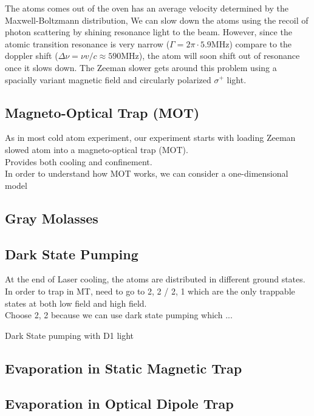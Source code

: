 The atoms comes out of the oven has an average velocity determined by the Maxwell-Boltzmann distribution,
We can slow down the atoms using the recoil of photon scattering by shining resonance light to the beam. However, since the atomic transition resonance is very narrow ($\Gamma=2\pi\cdot5.9\text{MHz}$) compare to the doppler shift ($\Delta\nu=\nu v/c\approx590\text{MHz}$), the atom will soon shift out of resonance once it slows down. The Zeeman slower gets around this problem using a spacially variant magnetic field and circularly polarized $\sigma^+$ light.


\subsection{Magneto-Optical Trap (MOT)}\label{theory:mot}

As in most cold atom experiment, our experiment starts with loading Zeeman slowed atom into a magneto-optical trap (MOT).\\
Provides both cooling and confinement.\\
In order to understand how MOT works, we can consider a one-dimensional model\\

\subsection{Gray Molasses}\label{theory:gm}

\subsection{Dark State Pumping}\label{theory:pump}
At the end of Laser cooling, the atoms are distributed in different ground states.\\
In order to trap in MT, need to go to 2, 2 / 2, 1 which are the only trappable states at both low field and high field.\\
Choose 2, 2 because we can use dark state pumping which ...

Dark State pumping with D1 light

\subsection{Evaporation in Static Magnetic Trap}\label{theory:mt}

\subsection{Evaporation in Optical Dipole Trap}\label{theory:odt}
